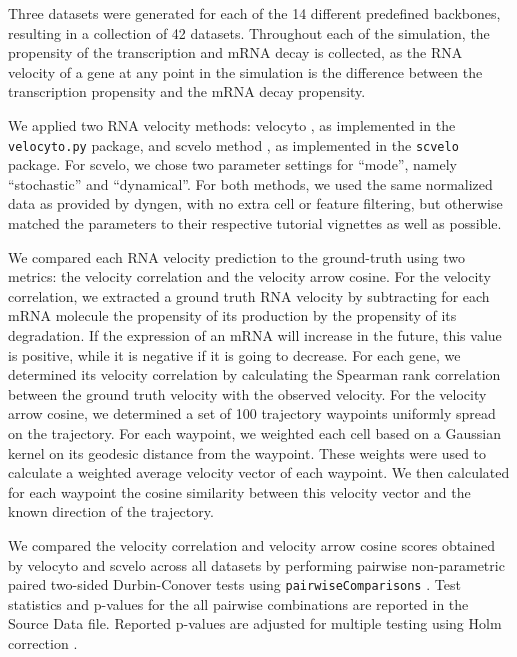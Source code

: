 \documentclass[10pt, a4paper]{article}
\begin{document}
Three datasets were generated for each of the 14 different predefined
backbones, resulting in a collection of 42 datasets. Throughout each of
the simulation, the propensity of the transcription and mRNA decay is
collected, as the RNA velocity of a gene at any point in the simulation
is the difference between the transcription propensity and the mRNA
decay propensity.

We applied two RNA velocity methods: velocyto
\cite{lamanno_rnavelocitysingle_2018}, as implemented in the
\texttt{velocyto.py} package, and scvelo method
\cite{bergen_generalizingrnavelocity_2020}, as implemented in the
\texttt{scvelo} package. For scvelo, we chose two parameter settings for
``mode'', namely ``stochastic'' and ``dynamical''. For both methods, we
used the same normalized data as provided by dyngen, with no extra cell
or feature filtering, but otherwise matched the parameters to their
respective tutorial vignettes as well as possible.

We compared each RNA velocity prediction to the ground-truth using two
metrics: the velocity correlation and the velocity arrow cosine. For the
velocity correlation, we extracted a ground truth RNA velocity by
subtracting for each mRNA molecule the propensity of its production by
the propensity of its degradation. If the expression of an mRNA will
increase in the future, this value is positive, while it is negative if
it is going to decrease. For each gene, we determined its velocity
correlation by calculating the Spearman rank correlation between the
ground truth velocity with the observed velocity. For the velocity arrow
cosine, we determined a set of 100 trajectory waypoints uniformly spread
on the trajectory. For each waypoint, we weighted each cell based on a
Gaussian kernel on its geodesic distance from the waypoint. These
weights were used to calculate a weighted average velocity vector of
each waypoint. We then calculated for each waypoint the cosine
similarity between this velocity vector and the known direction of the
trajectory.

We compared the velocity correlation and velocity arrow cosine scores
obtained by velocyto and scvelo across all datasets by performing
pairwise non-parametric paired two-sided Durbin-Conover tests
\cite{conover_multiplecomparisonsprocedures_1979} using
\texttt{pairwiseComparisons}
\cite{patil_pairwisecomparisonsmultiplepairwise_2019}. Test
statistics and p-values for the all pairwise combinations are reported
in the Source Data file. Reported p-values are adjusted for multiple
testing using Holm correction
\cite{holm_simplesequentiallyrejective_1979}.
\end{document}
